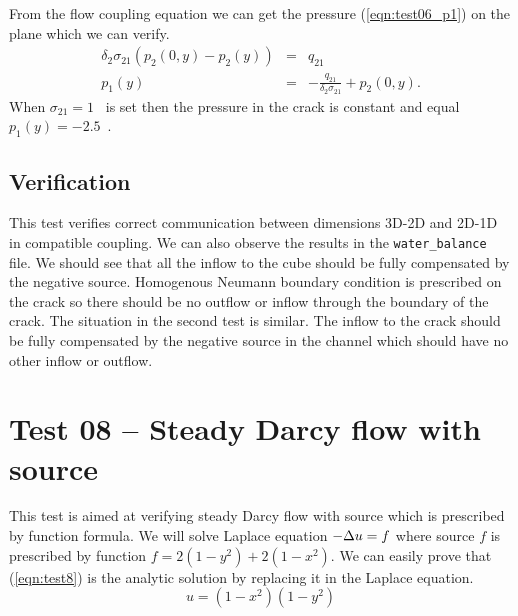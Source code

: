 From the flow coupling equation we can get the pressure (\ref{eqn:test06_p1}) on the plane which we can verify.
\begin{eqnarray} 
     \delta_2 \sigma_{21} ( p_2(0,y) - p_2(y) ) &=& q_{21} \nonumber\\
     p_1(y) &=& -\frac{q_{21}}{\delta_2 \sigma_{21}} + p_2(0,y) \label{eqn:test06_p1}.
\end{eqnarray}   
When $\sigma_{21} = 1$~ is set then the pressure in the crack is constant and equal $p_1(y) = -2.5$~.


\subsection*{Verification}
This test verifies correct communication between dimensions 3D-2D and 2D-1D in compatible coupling.
We can also observe the results in the \verb'water_balance' file. We should see that all the inflow 
to the cube should be fully compensated by the negative source. Homogenous Neumann boundary condition 
is prescribed on the crack so there should be no outflow or inflow through the boundary of the crack.
The situation in the second test is similar. The inflow to the crack should be fully compensated by 
the negative source in the channel which should have no other inflow or outflow.



\section{Test 08 -- Steady Darcy flow with source}
\label{sec:test08}
This test is aimed at verifying steady Darcy flow with source which is prescribed by function formula. 
We will solve Laplace equation $-\Delta{}u = f$ where source $f$ is prescribed by function $f = 2(1-y^2) + 2(1-x^2)$.
We can easily prove that (\ref{eqn:test8}) is the analytic solution by replacing it in the Laplace equation.
\begin{equation}
u = (1-x^2)(1-y^2) \label{eqn:test8}
\end{equation}

